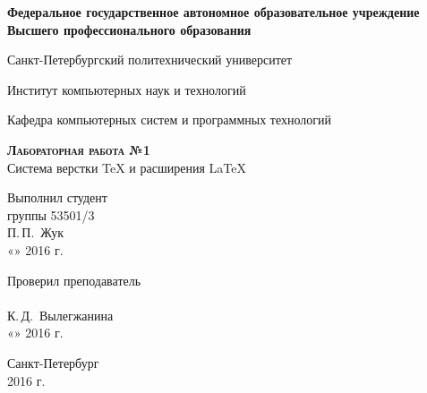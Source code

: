 \documentclass[10pt,a4paper,titlepage]{article}
\begin{document}
\begin{titlepage}
  \begin{center}
    \large
    \textbf{Федеральное государственное автономное образовательное учреждение\\
    Высшего профессионального образования}

    \vspace{0.25cm}

    Санкт-Петербургский политехнический университет
    \vspace{0.25cm}
    
    Институт компьютерных наук и технологий
    \vspace{0.25cm}
    
    Кафедра компьютерных систем и программных технологий
    \vfill

    \textbf{\textsc{Лабораторная работа №1}}\\[5mm]
    
    {\LARGE Система верстки \TeX{} и расширения \LaTeX}
  \bigskip
    
\end{center}
\vfill

\newlength{\ML}
\hfill\begin{minipage}{0.4\textwidth}
  Выполнил студент\\ группы 53501/3\\
  \underline{\hspace{\ML}} П.\,П.~Жук\\
  «\underline{\hspace{0.7cm}}» \underline{\hspace{2cm}} 2016 г.
\end{minipage}%
\bigskip

\hfill\begin{minipage}{0.4\textwidth}
  Проверил преподаватель\\
  \underline{\hspace{\ML}}\\ К.\,Д.~Вылегжанина\\
  «\underline{\hspace{0.7cm}}» \underline{\hspace{2cm}} 2016 г.
\end{minipage}%
\vfill

\begin{center}
  Санкт-Петербург\\ 2016 г.
\end{center}
\end{titlepage}
\tableofcontents
\newpage
\end{document}
